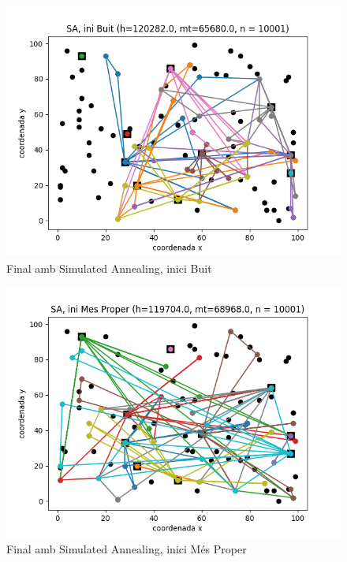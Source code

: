 \documentclass[a4paper]{article}
\begin{document}
\begin{figure}[htp]
\centering
\includegraphics[scale=0.65]{images/fig9.png}
\caption{Final amb Simulated Annealing, inici Buit}
\centering
\end{figure}

\begin{figure}[htp]
\centering
\includegraphics[scale=0.65]{images/fig10.png}
\caption{Final amb Simulated Annealing, inici Més Proper}
\centering
\end{figure}
\end{document}
